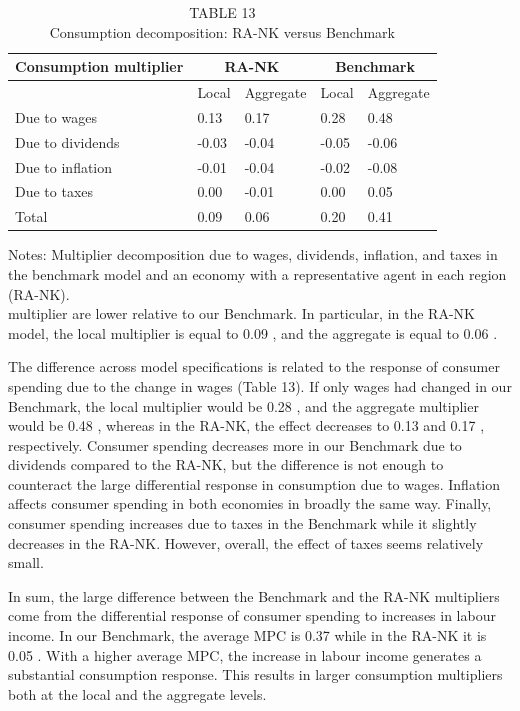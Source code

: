 \documentclass[10pt]{article}
\begin{document}
\begin{table}[h]
\begin{center}
\captionsetup{labelformat=empty}
\caption{TABLE 13\\
Consumption decomposition: RA-NK versus Benchmark}
\begin{tabular}{|l|l|l|l|l|}
\hline
\multirow[b]{2}{*}{Consumption multiplier} & \multicolumn{2}{|c|}{RA-NK} & \multicolumn{2}{|c|}{Benchmark} \\
\hline
 & Local & Aggregate & Local & Aggregate \\
\hline
Due to wages & 0.13 & 0.17 & 0.28 & 0.48 \\
\hline
Due to dividends & -0.03 & -0.04 & -0.05 & -0.06 \\
\hline
Due to inflation & -0.01 & -0.04 & -0.02 & -0.08 \\
\hline
Due to taxes & 0.00 & -0.01 & 0.00 & 0.05 \\
\hline
Total & 0.09 & 0.06 & 0.20 & 0.41 \\
\hline
\end{tabular}
\end{center}
\end{table}

Notes: Multiplier decomposition due to wages, dividends, inflation, and taxes in the benchmark model and an economy with a representative agent in each region (RA-NK).\\
multiplier are lower relative to our Benchmark. In particular, in the RA-NK model, the local multiplier is equal to 0.09 , and the aggregate is equal to 0.06 .

The difference across model specifications is related to the response of consumer spending due to the change in wages (Table 13). If only wages had changed in our Benchmark, the local multiplier would be 0.28 , and the aggregate multiplier would be 0.48 , whereas in the RA-NK, the effect decreases to 0.13 and 0.17 , respectively. Consumer spending decreases more in our Benchmark due to dividends compared to the RA-NK, but the difference is not enough to counteract the large differential response in consumption due to wages. Inflation affects consumer spending in both economies in broadly the same way. Finally, consumer spending increases due to taxes in the Benchmark while it slightly decreases in the RA-NK. However, overall, the effect of taxes seems relatively small.

In sum, the large difference between the Benchmark and the RA-NK multipliers come from the differential response of consumer spending to increases in labour income. In our Benchmark, the average MPC is 0.37 while in the RA-NK it is 0.05 . With a higher average MPC, the increase in labour income generates a substantial consumption response. This results in larger consumption multipliers both at the local and the aggregate levels.
\end{document}
